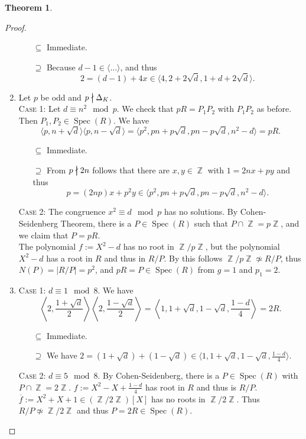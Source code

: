 \documentclass[12pt,a4paper]{report}
\theoremstyle{definition}
\newtheorem{theorem}{Theorem}[chapter] %
\theoremstyle{num.custom-title}
\DeclareMathOperator{\Z}{\mathbb{Z}}
\DeclareMathOperator{\sse}{\subseteq}
\DeclareMathOperator{\Spec}{Spec}
\newcommand{\ol}{\overline}
\newcommand{\ndivides}{%
  \mathrel{\mkern.5mu %
    \ooalign{\hidewidth$\big|$\hidewidth\cr$\nmid$\cr}%
  }%
}
\begin{document}
\begin{theorem}
\begin{proof}
\begin{enumerate}
\begin{itemize}
\item[$\sse$] Immediate.
\item[$\supseteq$] Because $d-1 \in \langle ... \rangle$, and thus
\[
2 = (d-1)+4x \in \langle 4, 2+2\sqrt{d}, 1+d+2\sqrt{d} \rangle.
\]
\end{itemize}
\item Let $p$ be odd and $p \ndivides \Delta_K$.\\
\textsc{Case 1:} Let $d \equiv n^2 \mod p$. We check that $pR = P_1 P_2$ with $P_1 P_2$ as before. Then $P_1,P_2 \in \Spec(R)$. We have
\[
\langle p, n+\sqrt{d} \rangle \langle p, n-\sqrt{d} \rangle = \langle p^2, pn+p\sqrt{d}, pn-p\sqrt{d}, n^2-d \rangle = pR.
\]
\begin{itemize}
\item[$\sse$] Immediate.
\item[$\supseteq$] From $p \ndivides 2n$ follows that there are $x,y \in \Z$ with $1=2nx+py$ and thus
\[
p = (2np)x+p^2 y \in \langle p^2, pn+p\sqrt{d}, pn-p\sqrt{d}, n^2-d \rangle.
\]
\end{itemize}
\textsc{Case 2:} The congruence $x^2 \equiv d \mod p$ has no solutions. By Cohen-Seidenberg Theorem, there is a $P \in \Spec(R)$ such that $P \cap \Z = p\Z$, and we claim that $P = pR$.\\
The polynomial $f:=X^2-d$ has no root in $\Z/p\Z$, but the polynomial $X^2-d$ has a root in $R$ and thus in $R/P$. By this follows $\Z/p\Z \not\simeq R/P$, thus $N(P) = |R/P| = p^2$, and $pR = P \in \Spec(R)$ from $g=1$ and $p_1 = 2$.
\item \textsc{Case 1:} $d \equiv 1 \mod 8$. We have
\[
\left\langle 2, \frac{1+\sqrt{d}}{2} \right\rangle \left\langle 2, \frac{1-\sqrt{d}}{2} \right\rangle = \left\langle 1, 1+\sqrt{d}, 1-\sqrt{d}, \frac{1-d}{4} \right\rangle = 2R.
\]
\begin{itemize}
\item[$\sse$] Immediate.
\item[$\supseteq$] We have $2=(1+\sqrt{d})+(1-\sqrt{d}) \in \langle 1, 1+\sqrt{d}, 1-\sqrt{d}, \frac{1-d}{4} \rangle$.
\end{itemize}
\textsc{Case 2:} $d \equiv 5 \mod 8$. By Cohen-Seidenberg, there is a $P \in \Spec(R)$ with $P \cap \Z = 2\Z$. $f := X^2-X+\frac{1-d}{4}$ has root in $R$ and thus is $R/P$. $\ol{f} := X^2+X+1 \in (\Z/2\Z)[X]$ has no roots in $\Z/2\Z$. Thus $R/P \not\simeq \Z/2\Z$ and thus $P=2R \in \Spec(R)$.
\end{enumerate}
\end{proof}
\end{theorem}
\end{document}
